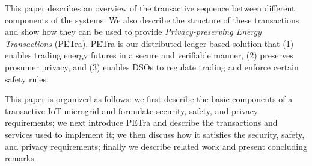 This paper describes an overview of the transactive sequence between
different components of the systems. We also describe the structure of
these transactions and show how they can be used to provide
\emph{Privacy-preserving Energy Transactions} (PETra). PETra is our
distributed-ledger based solution that (1) enables trading energy
futures in a secure and verifiable manner, (2) preserves prosumer
privacy, and (3) enables DSOs to regulate trading and enforce certain
safety rules.

This paper is organized as follows: we first describe
the basic components of a transactive IoT microgrid and formulate
security, safety, and privacy requirements; we next introduce PETra
and describe the transactions and services used to implement it; we
then discuss how it satisfies the security, safety, and privacy
requirements; finally we 
describe related work
and present concluding remarks.

